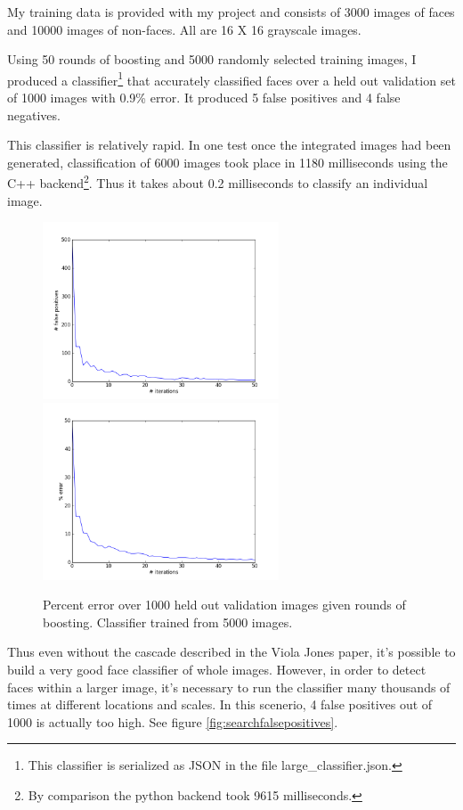 \documentclass[11pt,twocolumn]{article}
\begin{document}
My training data\cite{trainingdata} is provided with my project and
consists of 3000 images of faces and 10000 images of non-faces. All
are 16 X 16 grayscale images.

Using 50 rounds of boosting and 5000 randomly selected training
images, I produced a classifier\footnote{This classifier is serialized
  as JSON in the file large\_classifier.json.}  that accurately
classified faces over a held out validation set of 1000 images with
0.9\% error. It produced 5 false positives and 4 false negatives.

This classifier is relatively rapid. In one test once the integrated
images had been generated, classification of 6000 images took place in
1180 milliseconds using the C++ backend\footnote{By comparison the
  python backend took 9615 milliseconds.}. Thus it takes about 0.2
milliseconds to classify an individual image.

\begin{figure}
\includegraphics[width=70mm]{false_positives.png}
\includegraphics[width=70mm]{pct_err.png}
\caption{Percent error over 1000 held out validation images given
  rounds of boosting. Classifier trained from 5000 images.}
\label{fig:bootingiter}
\end{figure}



Thus even without the cascade described in the Viola Jones paper,
it's possible to build a very good face classifier of whole
images. However, in order to detect faces within a larger image, it's
necessary to run the classifier many thousands of times at different
locations and scales. In this scenerio, 4 false positives out of 1000
is actually too high. See figure \ref{fig:searchfalsepositives}.
\end{document}
